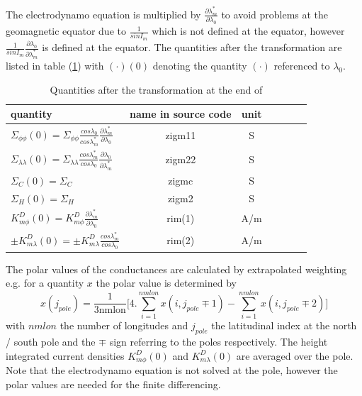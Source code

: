 %
The electrodynamo equation is multiplied by $\frac{\partial \lambda_m^*}{\partial\lambda_0}$ to avoid
problems at the geomagnetic equator due to $\frac{1}{sin I_m}$ 
which is not defined at the equator, however
$\frac{1}{sin I_m}\frac{\partial \lambda_0}{\partial \lambda_m^*}$ is defined at the equator.
The quantities after the transformation are listed in table (\ref{tab:transf_quantities}) 
with $(\cdot)(0)$
denoting the quantity $(\cdot)$ referenced to $\lambda_0$.
%
\begin{table}[tb]
\begin{tabular}{|p{4.0cm} ||c|c|c|c|c|c|} \hline
 quantity               &  name in source code & unit  \\ \hline \hline
%
$\Sigma_{\phi \phi}(0)=\Sigma_{\phi \phi} \frac{cos \lambda_0}{cos \lambda_m^*}\frac{\partial \lambda_m^*}{\partial\lambda_0}$             & zigm11 & S   \\ 
$\Sigma_{\lambda \lambda}(0)=\Sigma_{\lambda \lambda}\frac{cos \lambda_m^*}{cos \lambda_0}\frac{\partial \lambda_0}{\partial\lambda_m^*}$  & zigm22 & S   \\ 
${\Sigma_{C}}(0)={\Sigma_{C}}$			    & zigmc  & S   \\ 
${\Sigma_{H}}(0)={\Sigma_{H}}$			    & zigm2  & S   \\ 
$K_{m \phi}^D(0)=K_{m \phi}^D\frac{\partial \lambda_m^*}{\partial\lambda_0}$                & rim(1) & A/m   \\ 
$\pm K_{m \lambda}^D(0)=\pm K_{m \lambda}^D\frac{cos \lambda_m^*}{cos \lambda_0}$   & rim(2) & A/m   \\ \hline
%
\end{tabular}
\caption{Quantities after the transformation at the end of  
}
\label{tab:transf_quantities}
\end{table} 
% 
The polar values of the conductances are calculated by extrapolated weighting e.g. for a 
quantity $x$ the polar value is determined by
%
\begin{equation}
  x (j_{pole}) = \frac{1}{3 \text{nmlon}} \bigl[ 4. \sum_{i=1}^{nmlon} x(i,j_{pole} \mp 1) -
     \sum_{i=1}^{nmlon} x(i,j_{pole} \mp 2) \bigr]
\end{equation}
%
with $nmlon$ the number of longitudes and $j_{pole}$ the latitudinal index at
the north / south pole and the $\mp$ sign referring to the poles
respectively. The height integrated current densities $K_{m \phi}^D(0)$ and 
$K_{m \lambda}^D(0)$ are averaged over the pole. Note that the electrodynamo
equation is not solved at the pole, however the polar values are needed for
the finite differencing.
